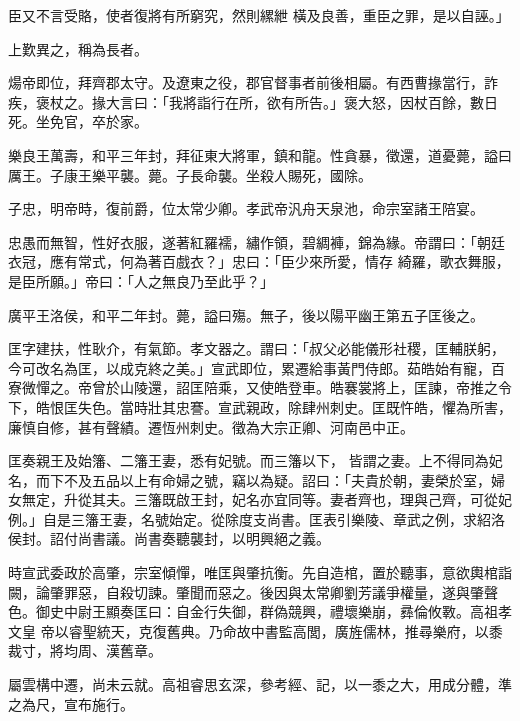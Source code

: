 \begin{pinyinscope}
 臣又不言受賂，使者復將有所窮究，然則縲紲
 橫及良善，重臣之罪，是以自誣。」



 上歎異之，稱為長者。



 煬帝即位，拜齊郡太守。及遼東之役，郡官督事者前後相屬。有西曹掾當行，詐疾，褒杖之。掾大言曰：「我將詣行在所，欲有所告。」褒大怒，因杖百餘，數日死。坐免官，卒於家。



 樂良王萬壽，和平三年封，拜征東大將軍，鎮和龍。性貪暴，徵還，道憂薨，謚曰厲王。子康王樂平襲。薨。子長命襲。坐殺人賜死，國除。



 子忠，明帝時，復前爵，位太常少卿。孝武帝汎舟天泉池，命宗室諸王陪宴。



 忠愚而無智，性好衣服，遂著紅羅襦，繡作領，碧綢褲，錦為緣。帝謂曰：「朝廷衣冠，應有常式，何為著百戲衣？」忠曰：「臣少來所愛，情存
 綺羅，歌衣舞服，是臣所願。」帝曰：「人之無良乃至此乎？」



 廣平王洛侯，和平二年封。薨，謚曰殤。無子，後以陽平幽王第五子匡後之。



 匡字建扶，性耿介，有氣節。孝文器之。謂曰：「叔父必能儀形社稷，匡輔朕躬，今可改名為匡，以成克終之美。」宣武即位，累遷給事黃門侍郎。茹皓始有寵，百寮微憚之。帝曾於山陵還，詔匡陪乘，又使皓登車。皓褰裳將上，匡諫，帝推之令下，皓恨匡失色。當時壯其忠謇。宣武親政，除肆州刺史。匡既忤皓，懼為所害，廉慎自修，甚有聲績。遷恆州刺史。徵為大宗正卿、河南邑中正。



 匡奏親王及始籓、二籓王妻，悉有妃號。而三籓以下，
 皆謂之妻。上不得同為妃名，而下不及五品以上有命婦之號，竊以為疑。詔曰：「夫貴於朝，妻榮於室，婦女無定，升從其夫。三籓既啟王封，妃名亦宜同等。妻者齊也，理與己齊，可從妃例。」自是三籓王妻，名號始定。從除度支尚書。匡表引樂陵、章武之例，求紹洛侯封。詔付尚書議。尚書奏聽襲封，以明興絕之義。



 時宣武委政於高肇，宗室傾憚，唯匡與肇抗衡。先自造棺，置於聽事，意欲輿棺詣闕，論肇罪惡，自殺切諫。肇聞而惡之。後因與太常卿劉芳議爭權量，遂與肇聲色。御史中尉王顯奏匡曰：自金行失御，群偽競興，禮壞樂崩，彞倫攸斁。高祖孝文皇
 帝以睿聖統天，克復舊典。乃命故中書監高閭，廣旌儒林，推尋樂府，以黍裁寸，將均周、漢舊章。



 屬雲構中遷，尚未云就。高祖睿思玄深，參考經、記，以一黍之大，用成分體，準之為尺，宣布施行。




\end{pinyinscope}
